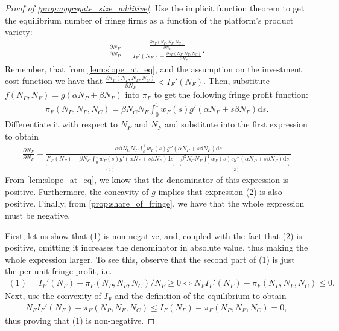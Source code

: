 \documentclass[a4paper]{article}
\newcommand{\ds}{\mathrm{d}s}
\begin{document}
\begin{proof}[Proof of \cref{prop:aggregate_size_additive}]
    Use the implicit function theorem to get the equilibrium number of fringe firms as a function of the platform's product variety:
    \begin{align*}
        \frac{\partial N_F}{\partial N_P} = \frac{\frac{\partial \pi_F(N_P, N_F, N_C)}{\partial N_P}}{I_F'(N_F) - \frac{\partial \pi_F (N_P, N_F, N_C)}{\partial N_F}}.
    \end{align*}
    Remember, that from \cref{lem:slope_at_eq}, and the assumption on the investment cost function we have that $\frac{\partial \pi_F (N_P, N_F, N_C)}{\partial N_F} < I_F'(N_F)$.
    Then, substitute $f(N_P, N_F) = g(\alpha N_P + \beta N_P)$ into $\pi_F$ to get the following fringe profit function:
    \begin{align*}
        \pi_F(N_P, N_F, N_C) = \beta N_C N_F \int_0^1 w_F(s) g'(\alpha N_P + s \beta N_F) \ds.
    \end{align*}
    Differentiate it with respect to $N_P$ and $N_F$ and substitute into the first expression to obtain
    \begin{align*}
        \frac{\partial N_F}{\partial N_P} = \frac{
            \alpha \beta N_C N_P \int_0^1 w_F(s) g''(\alpha N_P + s \beta N_F) \ds
        }{
            \underbracket{I'_F(N_F) - \beta N_C \int_0^1 w_F(s) g'(\alpha N_P + s \beta N_F) \ds}_{(1)} - \underbracket{\beta^2 N_C N_F \int_0^1 w_F(s) s g''(\alpha N_P + s \beta N_F) \ds}_{(2)}.
        }
    \end{align*}
    From \cref{lem:slope_at_eq}, we know that the denominator of this expression is positive.
    Furthermore, the concavity of $g$ implies that expression (2) is also positive.
    Finally, from \cref{prop:share_of_fringe}, we have that the whole expression must be negative.

    First, let us show that (1) is non-negative, and, coupled with the fact that (2) is positive, omitting it increases the denominator in absolute value, thus making the whole expression larger.
    To see this, observe that the second part of (1) is just the per-unit fringe profit, i.e.
    \begin{align*}
        (1) = I_F'(N_F) - \pi_F(N_P, N_F, N_C) / N_F \geq 0 \Leftrightarrow N_F I_F'(N_F) - \pi_F(N_P, N_F, N_C) \leq 0.
    \end{align*}
    Next, use the convexity of $I_F$ and the definition of the equilibrium to obtain
    \begin{align*}
        N_F I_F'(N_F) - \pi_F(N_P, N_F, N_C) \leq I_F(N_F) - \pi_F(N_P, N_F, N_C) = 0,
    \end{align*}
    thus proving that (1) is non-negative.


\end{proof}
\end{document}
